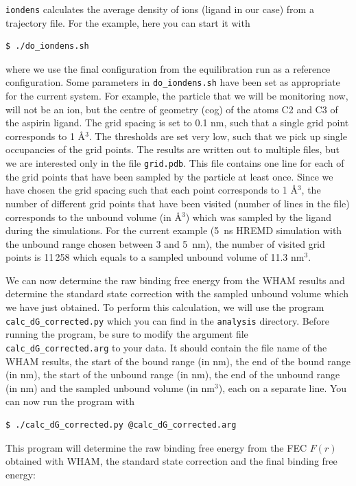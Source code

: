 \texttt{iondens} calculates the average density of ions (ligand in our case) from a trajectory file.
For the example, here you can start it with
\begin{lstlisting}
$ ./do_iondens.sh 
\end{lstlisting}
where we use the final configuration from the equilibration run as a reference configuration. 
Some parameters in \texttt{do\_iondens.sh} have been set as appropriate for the current system.
For example, the particle that we will be monitoring now, will not be an ion, but the centre of geometry (cog) of the atoms C2 and C3 of the aspirin ligand.
The grid spacing is set to 0.1 nm, such that a single grid point corresponds to 1 \AA$^3$.
The thresholds are set very low, such that we pick up single occupancies of the grid points.
The results are written out to multiple files, but we are interested only in the file \texttt{grid.pdb}.
This file contains one line for each of the grid points that have been sampled by the particle at least once. 
Since we have chosen the grid spacing such that each point corresponds to 1 \AA$^3$, the number of different grid points that have been visited (number of lines in the file) corresponds to the unbound volume (in \AA$^3$) which was sampled by the ligand during the simulations. 
For the current example (5~ns HREMD simulation with the unbound range chosen between 3 and 5~nm), the number of visited grid points is 11\,258 which equals to a sampled unbound volume of 11.3 nm$^3$.


We can now determine the raw binding free energy from the WHAM results and determine the standard state correction with the sampled unbound volume which we have just obtained.
To perform this calculation, we will use the program \texttt{calc\_dG\_corrected.py} which you can find in the \texttt{analysis} directory. 
Before running the program, be sure to modify the argument file \texttt{calc\_dG\_corrected.arg} to your data.
It should contain the file name of the WHAM results, the start of the bound range (in nm), the end of the bound range (in nm), the start of the unbound range (in nm), the end of the unbound range (in nm) and the sampled unbound volume (in nm$^3$), each on a separate line. 
You can now run the program with
\begin{lstlisting}
$ ./calc_dG_corrected.py @calc_dG_corrected.arg
\end{lstlisting}
%
This program will determine the raw binding free energy from the FEC $F(r)$  obtained with WHAM, the standard state correction and the final binding free energy:

